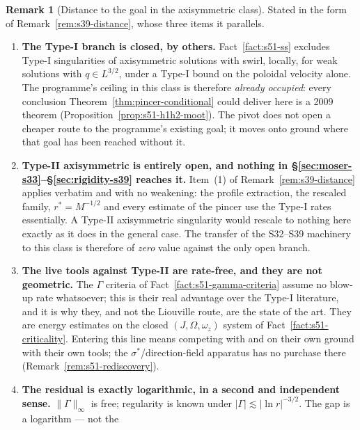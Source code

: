 \documentclass[11pt]{article}
\theoremstyle{definition}
\newtheorem{remark}[theorem]{Remark}
\theoremstyle{remark}
\begin{document}
\begin{remark}[Distance to the goal in the axisymmetric class]
  \label{rem:s51-ledger}
  Stated in the form of Remark~\ref{rem:s39-distance}, whose three items it
  parallels.
  \begin{enumerate}[label=\textup{(\arabic*)},leftmargin=2.4em]
  \item \textbf{The Type-I branch is closed, by others.}
    Fact~\ref{fact:s51-ss} excludes Type-I singularities of axisymmetric
    solutions with swirl, locally, for weak solutions with
    $q\in L^{3/2}$, under a Type-I bound on the poloidal velocity alone. The
    programme's ceiling in this class is therefore \emph{already occupied}:
    every conclusion Theorem~\ref{thm:pincer-conditional} could deliver here
    is a 2009 theorem (Proposition~\ref{prop:s51-h1h2-moot}). The pivot does
    not open a cheaper route to the programme's existing goal; it moves onto
    ground where that goal has been reached without it.
  \item \textbf{Type-II axisymmetric is entirely open, and nothing in
    \S\ref{sec:moser-s33}--\S\ref{sec:rigidity-s39} reaches it.} Item~(1) of
    Remark~\ref{rem:s39-distance} applies verbatim and with no weakening: the
    profile extraction, the rescaled family, $r^*=M^{-1/2}$ and every
    estimate of the pincer use the Type-I rates essentially. A Type-II
    axisymmetric singularity would rescale to nothing here exactly as it does
    in the general case. The transfer of the S32--S39 machinery to this class
    is therefore of \emph{zero} value against the only open branch.
  \item \textbf{The live tools against Type-II are rate-free, and they are not
    geometric.} The $\Gamma$ criteria of Fact~\ref{fact:s51-gamma-criteria}
    assume no blow-up rate whatsoever; this is their real advantage over the
    Type-I literature, and it is why they, and not the Liouville route, are
    the state of the art. They are energy estimates on the closed
    $(J,\Omega,\omega_z)$ system of Fact~\ref{fact:s51-criticality}. Entering
    this line means competing with \cite{LeiZhang2017} and \cite{Wei2016} on
    their own ground with their own tools; the $\sigma^*$/direction-field
    apparatus has no purchase there
    (Remark~\ref{rem:s51-rediscovery}).
  \item \textbf{The residual is exactly logarithmic, in a second and
    independent sense.} $\|\Gamma\|_\infty$ is free; regularity is known under
    $|\Gamma|\lesssim|\ln r|^{-3/2}$. The gap is a logarithm --- not the

\end{enumerate}
\end{remark}
\end{document}
